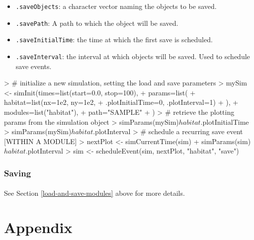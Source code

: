 \documentclass{article}
\begin{document}
\begin{itemize}
  \item \texttt{.saveObjects}: a character vector naming the objects to be saved.
  \item \texttt{.savePath}: A path to which the object will be saved.
  \item \texttt{.saveInitialTime}: the time at which the first save is scheduled.
  \item \texttt{.saveInterval}: the interval at which objects will be saved. Used to schedule save events.
\end{itemize}

\begin{Schunk}
\begin{Sinput}
> # initialize a new simulation, setting the load and save parameters
> mySim <- simInit(times=list(start=0.0, stop=100),
+                  params=list(
+                    habitat=list(nx=1e2, ny=1e2,
+                                 .plotInitialTime=0, .plotInterval=1)
+                    ),
+                  modules=list("habitat"),
+                  path="SAMPLE"
+ )
> # retrieve the plotting params from the simulation object
> simParams(mySim)$habitat$.plotInitialTime
> simParams(mySim)$habitat$.plotInterval
> # schedule a recurring save event [WITHIN A MODULE]
> nextPlot <- simCurrentTime(sim) + simParams(sim)$habitat$.plotInterval
> sim <- scheduleEvent(sim, nextPlot, "habitat", "save")
\end{Sinput}
\end{Schunk}

\subsubsection{Saving}

\paragraph{}
See Section \ref{load-and-save-modules} above for more details.

\newpage
\appendix
\renewcommand{\thesection}{}
\section{Appendix}
\renewcommand{\thesubsection}{\Alph{subsection}}
\end{document}
